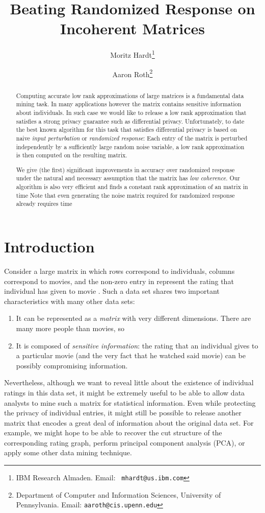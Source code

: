 \documentclass[letterpaper,11pt]{article}
\title{Beating Randomized Response on Incoherent Matrices}
\author{Moritz Hardt\thanks{IBM Research Almaden. Email: {\tt
mhardt@us.ibm.com}}
\and Aaron Roth\thanks{Department of Computer and Information Sciences, University of Pennsylvania. Email: {\tt aaroth@cis.upenn.edu}}}
\theoremstyle{definition}
\begin{document}
\maketitle

\begin{abstract}
Computing accurate low rank approximations of large matrices is a fundamental
data mining task. In many applications however the matrix contains sensitive
information about individuals. In such case we would like to release a low
rank approximation that satisfies a strong privacy guarantee such as
differential privacy. Unfortunately, to date the best known algorithm for this
task that satisfies differential privacy is based on naive \emph{input
perturbation} or \emph{randomized response}: Each entry of the matrix is
perturbed independently by a sufficiently large random noise variable, a low
rank approximation is then computed on the resulting matrix.

We give (the first) significant improvements in accuracy over randomized
response under the natural and necessary assumption that the matrix has
\emph{low coherence}.  Our algorithm is also very efficient and finds a
constant rank approximation of an  matrix in time  Note
that even generating the noise matrix required for randomized response already
requires time 
\end{abstract}

\vfill
\thispagestyle{empty}
\pagebreak

\section{Introduction}
Consider a large  matrix  in which rows correspond to
individuals, columns correspond to movies, and the non-zero entry in 
represent the rating that individual  has given to movie .  Such a data
set shares two important characteristics with many other data sets:
\begin{enumerate}
\item It can be represented as a \emph{matrix} with very different dimensions. There are many more people than movies, so 
\item It is composed of \emph{sensitive information}: the rating that an individual gives to a particular movie (and the very fact that he watched said movie) can be possibly compromising information.
\end{enumerate}
Nevertheless, although we want to reveal little about the existence of
individual ratings in this data set, it might be extremely useful to
be able to allow data analysts to mine such a matrix for statistical
information. Even while protecting the privacy of individual entries, it might
still be possible to release another matrix that encodes a great deal of
information about the original data set. For example, we might hope to be able
to recover the cut structure of the corresponding rating graph, perform
principal component analysis (PCA), or apply some other data mining technique.
\end{document}
